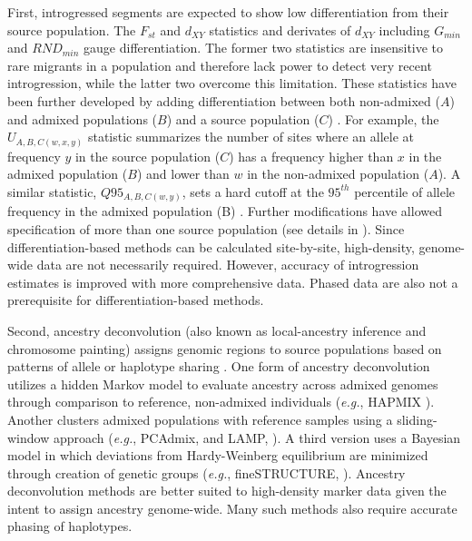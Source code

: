 \documentclass[11pt]{article}
\begin{document}
First, introgressed segments are expected to show low differentiation from their source population.
The $F_{st}$ and $d_{XY}$ statistics and derivates of $d_{XY}$ including $G_{min}$ \citep{geneva2015} and $RND_{min}$ \citep{rosenzweig2016} gauge differentiation. 
The former two statistics are insensitive to rare migrants in a population and therefore lack power to detect very recent introgression, while the latter two overcome this limitation.
These statistics have been further developed by adding differentiation between both non-admixed ($A$) and admixed populations ($B$) and a source population ($C$) \citep{racimo2016}. 
For example, the $U_{A,B,C(w,x,y)}$ statistic summarizes the number of sites where an allele at frequency $y$ in the source population ($C$) has a frequency higher than $x$ in the admixed population ($B$) and lower than $w$ in the non-admixed population ($A$).
A similar statistic, $Q95_{A,B,C(w,y)}$, sets a hard cutoff at the $95^{th}$ percentile of allele frequency in the admixed population (B) \citep{racimo2016}.
Further modifications have allowed specification of more than one source population (see details in \citealt{racimo2016}).
Since differentiation-based methods can be calculated site-by-site, high-density, genome-wide data are not necessarily required.
However, accuracy of introgression estimates is improved with more comprehensive data.
Phased data are also not a prerequisite for differentiation-based methods.
 
Second, ancestry deconvolution (also known as local-ancestry inference and chromosome painting) assigns genomic regions to source populations based on patterns of allele or haplotype sharing \citep{schraiber2015}. 
One form of ancestry deconvolution utilizes a hidden Markov model to evaluate ancestry across admixed genomes through comparison to reference, non-admixed individuals (\emph{e.g.}, HAPMIX \citealt{Price2009}). 
Another clusters admixed populations with reference samples using a sliding-window approach (\emph{e.g.}, PCAdmix, \citealt{brisbin2012pcadmix} and LAMP, \citealt{sankararaman2008}).
A third version uses a Bayesian model \citep{pritchard2000} in which deviations from Hardy-Weinberg equilibrium are minimized through creation of genetic groups (\emph{e.g.}, fineSTRUCTURE, \citealt{Lawson2012}).
Ancestry deconvolution methods are better suited to high-density marker data given the intent to assign ancestry genome-wide.
Many such methods also require accurate phasing of haplotypes.
\end{document}

